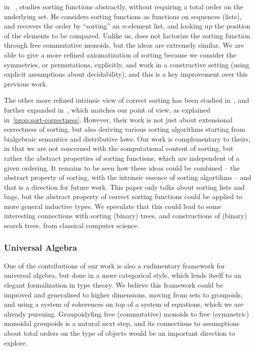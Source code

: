 \citeauthor*{hengleinWhatSortingFunction2009} in~
\cite{hengleinWhatSortingFunction2009}, studies sorting functions abstractly,
without requiring a total order on the underlying set.
%
He considers sorting functions as functions on sequences (lists),
and recovers the order by ``sorting'' an $n$-element list,
and looking up the position of the elements to be compared.
%
Unlike us, \citeauthor*{hengleinWhatSortingFunction2009} does not factorize the sorting function
through free commutative monoids, but the ideas are extremely similar.
%
We are able to give a more refined axiomatization of sorting because we consider the symmetries, or permutations,
explicitly, and work in a constructive setting (using explicit assumptions about decidability),
and this is a key improvement over this previous work.

The other more refined intrinsic view of correct sorting has been studied in~\cite{hinzeSortingBialgebrasDistributive2012},
and further expanded in~\cite{alexandruIntrinsicallyCorrectSorting2023}, which matches our point of view, as explained
in~\cref{prop:sort-correctness}.
%
However, their work is not just about extensional correctness of sorting, but also deriving various sorting algorithms
starting from bialgebraic semantics and distributive laws.
%
Our work is complementary to theirs, in that we are not concerned with the computational content of sorting, but rather
the abstract properties of sorting functions, which are independent of a given ordering.
%
It remains to be seen how these ideas could be combined -- the abstract property of sorting, with the intrinsic essence
of sorting algortihms -- and that is a direction for future work.
%
This paper only talks about sorting lists and bags, but the abstract property of correct sorting functions could be
applied to more general inductive types. We speculate that this could lead to some interesting connections with sorting
(binary) trees, and constructions of (binary) search trees, from classical computer science.

\subsubsection*{Universal Algebra}

One of the contributions of our work is also a rudimentary framework for universal algebra, but done in a more
categorical style, which lends itself to an elegant formalization in type theory.
%
We believe this framework could be improved and generalised to higher dimensions, moving from sets to groupoids,
and using a system of coherences on top of a system of equations, which we are already pursuing.
%
Groupoidyfing free (commutative) monoids to free (symmetric) monoidal groupoids is a natural next step, and its
connections to assumptions about total orders on the type of objects would be an important direction to explore.


